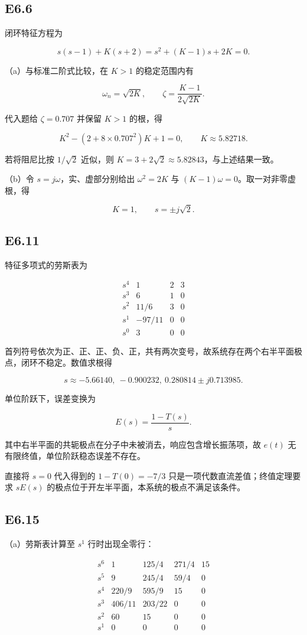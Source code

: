\documentclass[UTF8,12pt]{ctexart}
\begin{document}
\subsection*{E6.6}
闭环特征方程为

\[
s(s-1)+K(s+2)=s^2+(K-1)s+2K=0.
\]

（a）与标准二阶式比较，在 $K>1$ 的稳定范围内有

\[
\omega_n=\sqrt{2K},\qquad \zeta=\frac{K-1}{2\sqrt{2K}}.
\]

代入题给 $\zeta=0.707$ 并保留 $K>1$ 的根，得

\[
K^2-(2+8\times0.707^2)K+1=0,\qquad K\approx5.82718.
\]

若将阻尼比按 $1/\sqrt2$ 近似，则 $K=3+2\sqrt2\approx5.82843$，与上述结果一致。

（b）令 $s=j\omega$，实、虚部分别给出 $\omega^2=2K$ 与 $(K-1)\omega=0$。取一对非零虚根，得

\[
K=1,\qquad s=\pm j\sqrt2.
\]


\subsection*{E6.11}
特征多项式的劳斯表为

\[
\begin{array}{c|ccc}s^4&1&2&3\\s^3&6&1&0\\s^2&11/6&3&0\\s^1&-97/11&0&0\\s^0&3&0&0\end{array}
\]

首列符号依次为正、正、正、负、正，共有两次变号，故系统存在两个右半平面极点，闭环不稳定。数值求根得

\[
s\approx-5.66140,\ -0.900232,\ 0.280814\pm j0.713985.
\]

单位阶跃下，误差变换为

\[
E(s)=\frac{1-T(s)}s.
\]

其中右半平面的共轭极点在分子中未被消去，响应包含增长振荡项，故 $e(t)$ 无有限终值，单位阶跃稳态误差不存在。

直接将 $s=0$ 代入得到的 $1-T(0)=-7/3$ 只是一项代数直流差值；终值定理要求 $sE(s)$ 的极点位于开左半平面，本系统的极点不满足该条件。


\subsection*{E6.15}
（a）劳斯表计算至 $s^1$ 行时出现全零行：

\[
\begin{array}{c|rrrr}s^6&1&125/4&271/4&15\\s^5&9&245/4&59/4&0\\s^4&220/9&595/9&15&0\\s^3&406/11&203/22&0&0\\s^2&60&15&0&0\\s^1&0&0&0&0\end{array}
\]
\end{document}
